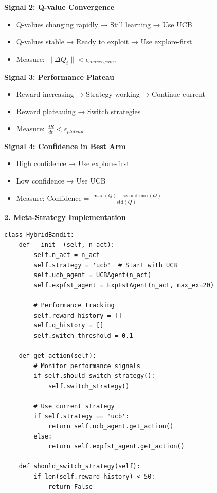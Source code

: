 \documentclass[12pt]{article}
\begin{document}
{{{\textbf{Signal 2: Q-value Convergence}
\begin{itemize}
\item Q-values changing rapidly → Still learning → Use UCB
\item Q-values stable → Ready to exploit → Use explore-first
\item Measure: $\|\Delta Q_t\| < \epsilon_{convergence}$
\end{itemize}

\textbf{Signal 3: Performance Plateau}
\begin{itemize}
\item Reward increasing → Strategy working → Continue current
\item Reward plateauing → Switch strategies
\item Measure: $\frac{dR}{dt} < \epsilon_{plateau}$
\end{itemize}

\textbf{Signal 4: Confidence in Best Arm}
\begin{itemize}
\item High confidence → Use explore-first
\item Low confidence → Use UCB
\item Measure: $\text{Confidence} = \frac{\max(Q) - \text{second\_max}(Q)}{\text{std}(Q)}$
\end{itemize}

\textbf{2. Meta-Strategy Implementation}

\begin{verbatim}
class HybridBandit:
    def __init__(self, n_act):
        self.n_act = n_act
        self.strategy = 'ucb'  # Start with UCB
        self.ucb_agent = UCBAgent(n_act)
        self.expfst_agent = ExpFstAgent(n_act, max_ex=20)
        
        # Performance tracking
        self.reward_history = []
        self.q_history = []
        self.switch_threshold = 0.1
        
    def get_action(self):
        # Monitor performance signals
        if self.should_switch_strategy():
            self.switch_strategy()
            
        # Use current strategy
        if self.strategy == 'ucb':
            return self.ucb_agent.get_action()
        else:
            return self.expfst_agent.get_action()
            
    def should_switch_strategy(self):
        if len(self.reward_history) < 50:
            return False
            

\end{verbatim}}}}
\end{document}
